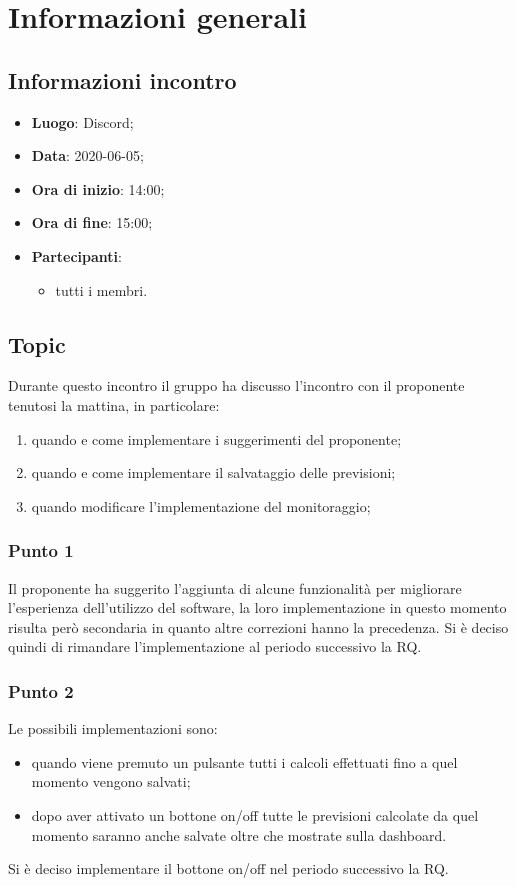 \section{Informazioni generali}
\subsection{Informazioni incontro}
\begin{itemize}
\item \textbf{Luogo}: Discord;
\item \textbf{Data}: 2020-06-05;
\item \textbf{Ora di inizio}: 14:00;
\item \textbf{Ora di fine}: 15:00;
\item \textbf{Partecipanti}:
	\begin{itemize}
		\item tutti i membri.
	\end{itemize}
\end{itemize}

\subsection{Topic}
Durante questo incontro il gruppo ha discusso l'incontro con il proponente tenutosi la mattina, in particolare:
\begin{enumerate}
	\item quando e come implementare i suggerimenti del proponente;
	\item quando e come implementare il salvataggio delle previsioni;
	\item quando modificare l'implementazione del monitoraggio;
\end{enumerate}

\subsubsection{Punto 1}
Il proponente ha suggerito l'aggiunta di alcune funzionalità per migliorare l'esperienza dell'utilizzo del software, la loro implementazione in questo momento risulta però secondaria in quanto altre correzioni hanno la precedenza. Si è deciso quindi di rimandare l'implementazione al periodo successivo la RQ.

\subsubsection{Punto 2}
Le possibili implementazioni sono:
\begin{itemize}
\item quando viene premuto un pulsante tutti i calcoli effettuati fino a quel momento vengono salvati;
\item dopo aver attivato un bottone on/off tutte le previsioni calcolate da quel momento saranno anche salvate oltre che mostrate sulla dashboard.
\end{itemize}
Si è deciso implementare il bottone on/off nel periodo successivo la RQ.


